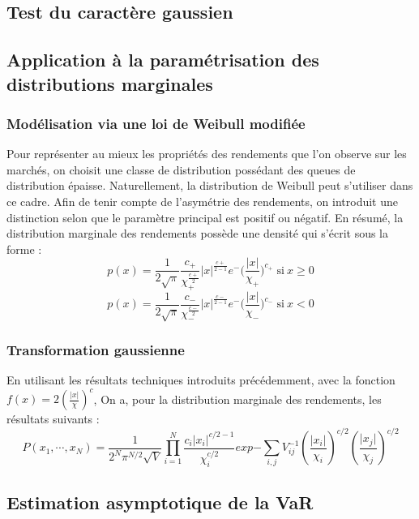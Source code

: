 \documentclass{article}
\begin{document}
  \subsection{Test du caractère gaussien} 
  \subsection{Application à la paramétrisation des distributions marginales}
  \subsubsection{Modélisation via une loi de Weibull modifiée}
   Pour représenter au mieux les propriétés des rendements que l'on observe sur les marchés, on choisit une classe de distribution possédant des queues de distribution épaisse. Naturellement, la distribution de Weibull peut s'utiliser dans ce cadre. Afin de tenir compte de l'asymétrie des rendements, on introduit une distinction selon que le paramètre principal est positif ou négatif. En résumé, la distribution marginale des rendements possède une densité qui s'écrit sous la forme :
   \begin{equation}
   p(x)=\frac{1}{2\sqrt{\pi}}\frac{c_{+}}{\chi _{+}^{\frac{c+}{2}}}\vert x\vert^{\frac{c+}{2-1}}e^-({\frac{\vert x\vert}{\chi _{+}})^{c_{+}}}\;\text{si}\: x\geqslant 0
   \end{equation}
  \begin{equation}
  p(x)=\frac{1}{2\sqrt{\pi}}\frac{c_{-}}{\chi _{-}^{\frac{c-}{2}}}\vert x\vert^{\frac{c-}{2-1}}e^-({\frac{\vert x\vert}{\chi _{-}})^{c_{-}}}\;\text{si}\: x<0
  \end{equation}
  \subsubsection{Transformation gaussienne}
  En utilisant les résultats techniques introduits précédemment, avec la fonction $ f(x)=2(\frac{\vert x\vert}{\chi})^{c} $, On a, pour la distribution marginale des rendements, les résultats suivants :
  \begin{equation}
  P(x_{1},\cdots ,x_{N})=\frac{1}{2^{N}\pi ^{N/2}\sqrt{V}}\prod ^{N}_{i=1}\frac{c_{i}\vert x_{i}\vert ^{c/2-1}}{\chi _{i}^{c/2}}exp{-\sum _{i,j}V_{ij}^{-1}(\frac{\vert x_{i}\vert}{\chi_{i}})^{c/2}(\frac{\vert x_{j}\vert}{\chi_{j}})^{c/2}}
  \end{equation}
  \subsection{Estimation asymptotique de la VaR}
\end{document}
